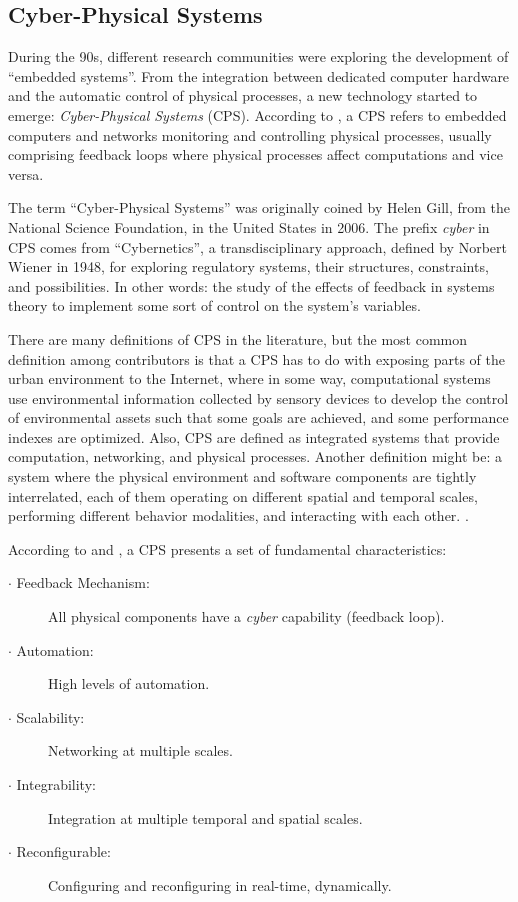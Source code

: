 \subsection{Cyber-Physical Systems}
\label{cyberphysicalsystems}

During the 90s, different research communities were exploring the development of ``embedded systems''. From the integration between dedicated computer hardware and the automatic control of physical processes, a new technology started to emerge: \emph{Cyber-Physical Systems} (CPS).
According to \cite{lee2011introduction}, a CPS refers to embedded computers and networks monitoring and controlling physical processes, usually comprising feedback loops where physical processes affect computations and vice versa.


The term ``Cyber-Physical Systems'' was originally coined by Helen Gill, from the National Science Foundation, in the United States in 2006. The prefix \emph{cyber} in CPS comes from ``Cybernetics'', a transdisciplinary approach, defined by Norbert Wiener in 1948, for exploring regulatory systems, their structures, constraints, and possibilities. In other words: the study of the effects of feedback in systems theory to implement some sort of control on the system's variables.


There are many definitions of CPS in the literature, but the most common definition among contributors is that a CPS has to do with exposing parts of the urban environment to the Internet, where in some way, computational systems use environmental information collected by sensory devices to develop the control of environmental assets such that some goals are achieved, and some performance indexes are optimized. Also, CPS are defined as integrated systems that provide computation, networking, and physical processes. Another definition might be: a system where the physical environment and software components are tightly interrelated, each of them operating on different spatial and temporal scales, performing different behavior modalities, and interacting with each other. \citep{conti2012looking, sha2009cyber, horvath2012cyber, lee2009computing, nsf10515, khaitan2015design}.

According to \cite{miclea2011dependability} and \cite{khaitan2015design}, a CPS presents a set of fundamental characteristics:

\begin{description}
  \item[$\cdot$ Feedback Mechanism:] All physical components have a \emph{cyber} capability (feedback loop).
  \item[$\cdot$ Automation:] High levels of automation.
  \item[$\cdot$ Scalability:] Networking at multiple scales.
  \item[$\cdot$ Integrability:] Integration at multiple temporal and spatial scales.
  \item[$\cdot$ Reconfigurable:] Configuring and reconfiguring in real-time, dynamically.
\end{description}


